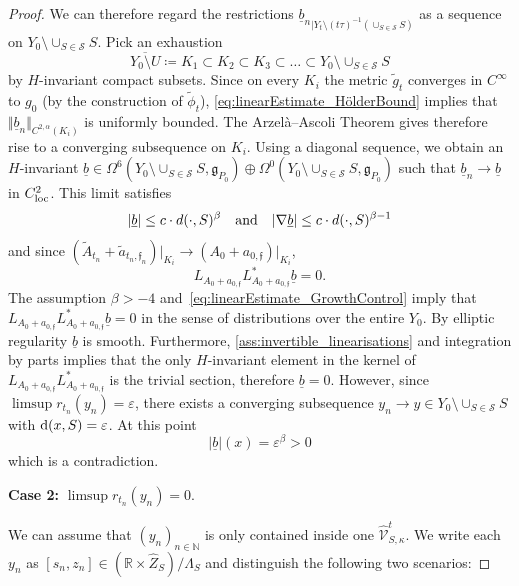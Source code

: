 \documentclass[11pt,a4paper]{scrartcl}
\newcommand{\VertH}[2]{\Vert_{C^{{#1},\alpha}{#2}}}
\numberwithin{equation}{section}
\theoremstyle{plain}
\theoremstyle{definition}
\theoremstyle{remark}
\begin{document}
\begin{proof}
We can therefore regard the restrictions ${\underline{b}_n}_{\vert Y_t \setminus (t\tau)^{-1}(\cup_{S\in \mathcal{S}} S)}$ as a sequence on $Y_0\setminus \cup_{S \in \mathcal{S}} S$. Pick an exhaustion \[ \overline{Y_0\setminus U} \coloneqq K_1 \subset K_2 \subset K_3 \subset \dots \subset Y_0 \setminus \cup_{S \in \mathcal{S}} S \] by $H$-invariant compact subsets. Since on every $K_i$ the metric $\tilde{g}_t$ converges in $C^\infty$ to $g_0$ (by the construction of $\tilde{\phi}_t$), \eqref{eq:linearEstimate_HölderBound} implies that $\Vert {\underline{b}_n} \VertH{2}{(K_i)}$ is uniformly bounded. The Arzelà--Ascoli Theorem gives therefore rise to a converging subsequence on $K_i$. Using a diagonal sequence, we obtain an $H$-invariant $\underline{b} \in \Omega^{6}(Y_0 \setminus \cup_{S\in \mathcal{S}} S,\mathfrak{g}_{P_0})\oplus \Omega^{0}(Y_0 \setminus \cup_{S\in \mathcal{S}} S,\mathfrak{g}_{P_0})$ such that $\underline{b}_n \to \underline{b}$ in $C^{2}_{\textup{loc}}$. This limit satisfies 
\begin{equation}\label{eq:linearEstimate_GrowthControl}
\vert \underline{b} \vert \leq c \cdot d(\cdot,S)^{\beta} \quad \textup{and} \quad \vert \nabla \underline{b} \vert \leq c \cdot d(\cdot,S)^{\beta-1}
\end{equation}
and since $(\tilde{A}_{t_n}+\tilde{a}_{t_n,\mathfrak{f}_n})\vert_{K_i} \to ({A_0}+a_{0,\mathfrak{f}})\vert_{K_i}$, \[L_{A_0+a_{0,\mathfrak{f}}}L_{A_0+a_{0,\mathfrak{f}}}^* \underline{b} = 0.\] The assumption $\beta >-4$ and~\eqref{eq:linearEstimate_GrowthControl} imply that $L_{A_0+a_{0,\mathfrak{f}}}L_{A_0+a_{0,\mathfrak{f}}}^* \underline{b} =0$ in the sense of distributions over the entire $Y_0$. By elliptic regularity $\underline{b}$ is smooth. Furthermore, \autoref{ass:invertible_linearisations} and integration by parts implies that the only $H$-invariant element in the kernel of $L_{A_0+a_{0,\mathfrak{f}}}L_{A_0+a_{0,\mathfrak{f}}}^*$ is the trivial section, therefore $\underline{b}=0$. However, since $\limsup r_{t_n}(y_n) = \varepsilon$, there exists a converging subsequence $y_n \to y \in Y_0\setminus \cup_{S\in \mathcal{S}} S$ with $\textup{d}(x,S)=\varepsilon$. At this point \[ \vert\underline{b}\vert(x) = \varepsilon^{\beta}>0\] which is a contradiction.

\noindent \textbf{Case 2:} $\limsup r_{t_n}(y_n)=0$.

We can assume that $(y_n)_{n\in \mathbb{N}}$ is only contained inside one $\hat{\mathcal{V}}^{t}_{S,\kappa}$. We write each $y_n$ as $[s_n,z_n]\in (\mathbb{R}\times \hat{Z}_S)/\Lambda_S$ and distinguish the following two scenarios:


\end{proof}
\end{document}
